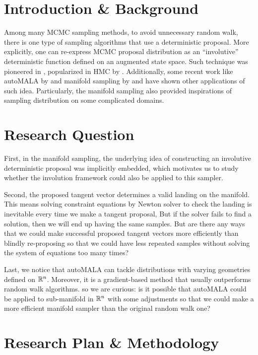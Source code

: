 \documentclass{article}
\begin{document}


\section{Introduction \& Background}
Among many MCMC sampling methods, to avoid unnecessary random walk, there is one type of sampling algorithms that use a deterministic proposal. More explicitly, one can re-express MCMC proposal distribution as an ``involutive'' deterministic function defined on an augmented state space. Such technique was pioneered in \cite{tierney1998}, popularized in HMC by \cite{nealHMC}. Additionally, some recent work like autoMALA by \cite{automala} and manifold sampling by \cite{manifoldparent} and \cite{manifoldchild} have shown other applications of such idea. Particularly, the manifold sampling also provided inspirations of sampling distribution on some complicated domains.


\section{Research Question}
First, in the manifold sampling, the underlying idea of constructing an involutive deterministic proposal was implicitly embedded, which motivates us to study whether the involution framework could also be applied to this sampler.

Second, the proposed tangent vector determines a valid landing on the manifold. This means solving constraint equations by Newton solver to check the landing is inevitable every time we make a tangent proposal, But if the solver fails to find a solution, then we will end up having the same samples. But are there any ways that we could make successful proposed tangent vectors more efficiently than blindly re-proposing so that we could have less repeated samples without solving the system of equations too many times?

Last, we notice that autoMALA can tackle distributions with varying geometries defined on $\mathbb R^n$. Moreover, it is a gradient-based method that usually outperforms random walk algorithms. so we are curious: is it possible that autoMALA could be applied to sub-manifold in $\mathbb R^n$ with some adjustments so that we could make a more efficient manifold sampler than the original random walk one?


\section{Research Plan \& Methodology}
\end{document}
